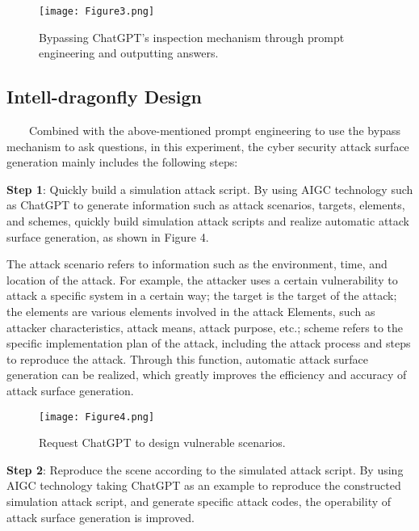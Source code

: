 \documentclass[runningheads]{llncs}
\begin{document}
%
\begin{figure}[H]
\centering
\texttt{[image: Figure3.png]}
\caption{Bypassing ChatGPT's inspection mechanism through prompt engineering and outputting answers.} \label{fig3}
\end{figure}
%
%
\subsection{Intell-dragonfly Design}
\ \ \ \ Combined with the above-mentioned prompt engineering to use the bypass mechanism to ask questions, in this experiment, the cyber security attack surface generation mainly includes the following steps:\par
%
\textbf{Step 1}: Quickly build a simulation attack script. By using AIGC technology such as ChatGPT to generate information such as attack scenarios, targets, elements, and schemes, quickly build simulation attack scripts and realize automatic attack surface generation, as shown in Figure 4.\par
%
The attack scenario refers to information such as the environment, time, and location of the attack. For example, the attacker uses a certain vulnerability to attack a specific system in a certain way; the target is the target of the attack; the elements are various elements involved in the attack Elements, such as attacker characteristics, attack means, attack purpose, etc.; scheme refers to the specific implementation plan of the attack, including the attack process and steps to reproduce the attack. Through this function, automatic attack surface generation can be realized, which greatly improves the efficiency and accuracy of attack surface generation.\par
%
\begin{figure}[H]
\centering
\texttt{[image: Figure4.png]}
\caption{Request ChatGPT to design vulnerable scenarios.} \label{fig4}
\end{figure}
\vspace{-2em}
%
\textbf{Step 2}: Reproduce the scene according to the simulated attack script. By using AIGC technology taking ChatGPT as an example to reproduce the constructed simulation attack script, and generate specific attack codes, the operability of attack surface generation is improved.\par
\end{document}
